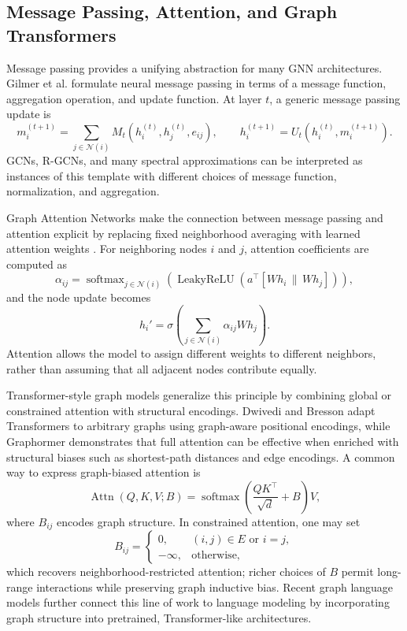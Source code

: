 \documentclass[11pt]{article}
\begin{document}
\subsection{Message Passing, Attention, and Graph Transformers}
Message passing provides a unifying abstraction for many GNN architectures. Gilmer et al. \cite{gilmer2017neural} formulate neural message passing in terms of a message function, aggregation operation, and update function. At layer $t$, a generic message passing update is
\[
    m_i^{(t+1)}
    = \sum_{j\in\mathcal{N}(i)} M_t\!\left(h_i^{(t)}, h_j^{(t)}, e_{ij}\right),
    \qquad
    h_i^{(t+1)}
    = U_t\!\left(h_i^{(t)}, m_i^{(t+1)}\right).
\]
GCNs, R-GCNs, and many spectral approximations can be interpreted as instances of this template with different choices of message function, normalization, and aggregation.

Graph Attention Networks make the connection between message passing and attention explicit by replacing fixed neighborhood averaging with learned attention weights \cite{velickovic2018graph}. For neighboring nodes $i$ and $j$, attention coefficients are computed as
\[
    \alpha_{ij}
    = \operatorname{softmax}_{j\in\mathcal{N}(i)}
      \left(
      \operatorname{LeakyReLU}\!\left(a^\top[Wh_i\,\|\,Wh_j]\right)
      \right),
\]
and the node update becomes
\[
    h_i'
    = \sigma\!\left(\sum_{j\in\mathcal{N}(i)} \alpha_{ij}Wh_j\right).
\]
Attention allows the model to assign different weights to different neighbors, rather than assuming that all adjacent nodes contribute equally.

Transformer-style graph models generalize this principle by combining global or constrained attention with structural encodings. Dwivedi and Bresson \cite{dwivedi2020generalization} adapt Transformers to arbitrary graphs using graph-aware positional encodings, while Graphormer \cite{ying2021transformers} demonstrates that full attention can be effective when enriched with structural biases such as shortest-path distances and edge encodings. A common way to express graph-biased attention is
\[
    \operatorname{Attn}(Q,K,V;B)
    = \operatorname{softmax}\!\left(\frac{QK^\top}{\sqrt{d}} + B\right)V,
\]
where $B_{ij}$ encodes graph structure. In constrained attention, one may set
\[
    B_{ij}=
    \begin{cases}
    0, & (i,j)\in E \text{ or } i=j,\\
    -\infty, & \text{otherwise},
    \end{cases}
\]
which recovers neighborhood-restricted attention; richer choices of $B$ permit long-range interactions while preserving graph inductive bias. Recent graph language models \cite{plenz-frank-2024-graph} further connect this line of work to language modeling by incorporating graph structure into pretrained, Transformer-like architectures.
\end{document}
